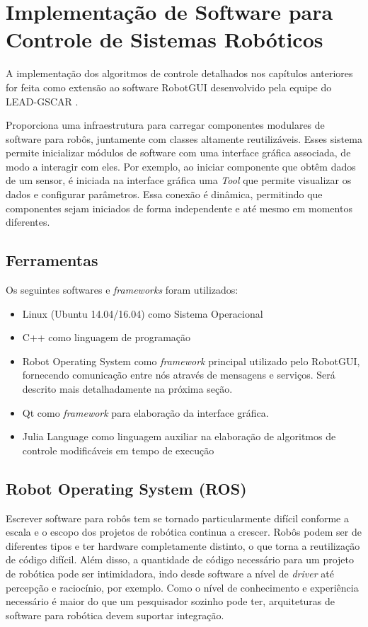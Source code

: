 \chapter{Implementação de Software para Controle de Sistemas Robóticos}
A implementação dos algoritmos de controle detalhados nos capítulos anteriores for feita como extensão ao software RobotGUI desenvolvido pela equipe do LEAD-GSCAR \citep{nunes2013doris}.

Proporciona uma infraestrutura para carregar componentes modulares de software para robôs, juntamente com classes altamente reutilizáveis. Esses sistema permite inicializar módulos de software com uma interface gráfica associada, de modo a interagir com eles. Por exemplo, ao iniciar componente que obtêm dados de um sensor, é iniciada na interface gráfica uma \textit{Tool} que permite visualizar os dados e configurar parâmetros. Essa conexão é dinâmica, permitindo que componentes sejam iniciados de forma independente e até mesmo em momentos diferentes.  


\section{Ferramentas}
Os seguintes softwares e \textit{frameworks} foram utilizados:

\begin{itemize}
\item Linux (Ubuntu 14.04/16.04) como Sistema Operacional
\item C++ como linguagem de programação
\item Robot Operating System \citep{quigley2009ros} como \textit{framework} principal utilizado pelo RobotGUI, fornecendo comunicação entre nós através de mensagens e serviços. Será descrito mais detalhadamente na próxima seção.
\item Qt \citep{qtcompany} como \textit{framework} para elaboração da interface gráfica. 
\item Julia Language como linguagem auxiliar na elaboração de algoritmos de controle modificáveis em tempo de execução
\end{itemize}

\section{Robot Operating System (ROS)}
Escrever software para robôs tem se tornado particularmente difícil conforme a escala e o escopo dos projetos de robótica continua a crescer. Robôs podem ser de diferentes tipos e ter hardware completamente distinto, o que torna a reutilização de código difícil. Além disso, a quantidade de código necessário para um projeto de robótica pode ser intimidadora, indo desde software a nível de \textit{driver} até percepção e raciocínio, por exemplo. Como o nível de conhecimento e experiência necessário é maior do que um pesquisador sozinho pode ter, arquiteturas de software para robótica devem suportar integração. 

